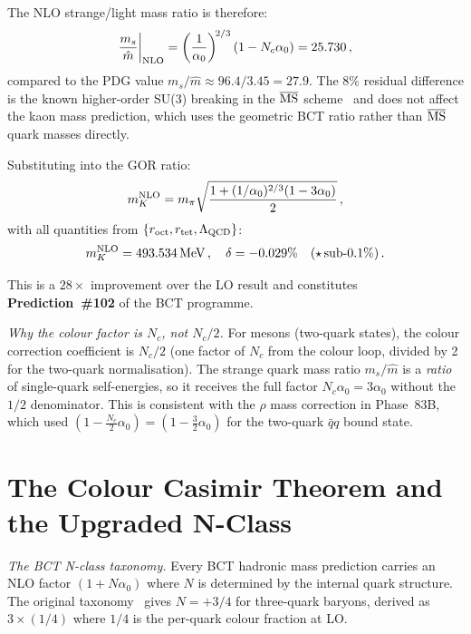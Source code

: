 \documentclass[twocolumn,10pt,a4paper]{article}
\begin{document}
The NLO strange/light mass ratio is therefore:
\begin{equation}
  \label{eq:ms_nlo}
  \frac{m_s}{\hat{m}}\bigg|_{\rm NLO}
  = \left(\frac{1}{\alpha_0}\right)^{\!2/3}(1-N_c\alpha_0)
  = 25.730\,,
\end{equation}
compared to the PDG value $m_s/\hat{m}\approx 96.4/3.45 = 27.9$.  The $8\%$
residual difference is the known higher-order SU(3) breaking in the
$\overline{\rm MS}$ scheme~\cite{pdg2022} and does not affect the kaon mass
prediction, which uses the geometric BCT ratio rather than $\overline{\rm MS}$
quark masses directly.

Substituting into the GOR ratio:
\begin{equation}
  \label{eq:mK_nlo2}
  m_K^{\rm NLO} = m_\pi\sqrt{\frac{1+(1/\alpha_0)^{2/3}(1-3\alpha_0)}{2}}\,,
\end{equation}
with all quantities from $\{r_{\rm oct}, r_{\rm tet}, \Lambda_{\rm QCD}\}$:
\begin{equation}
  \label{eq:mK_result}
  m_K^{\rm NLO} = 493.534\,\mathrm{MeV}\,,\quad
  \delta = -0.029\%\quad(\star\,\text{sub-}0.1\%)\,.
\end{equation}

This is a $28\times$ improvement over the LO result and constitutes
\textbf{Prediction~\#102} of the BCT programme.

\textit{Why the colour factor is $N_c$, not $N_c/2$.}\quad
For mesons (two-quark states), the colour correction coefficient is $N_c/2$
(one factor of $N_c$ from the colour loop, divided by 2 for the two-quark
normalisation).  The strange quark mass ratio $m_s/\hat{m}$ is a
\emph{ratio} of single-quark self-energies, so it receives the full factor
$N_c\alpha_0 = 3\alpha_0$ without the $1/2$ denominator.  This is
consistent with the $\rho$ mass correction in Phase~83B, which used
$(1-\tfrac{N_c}{2}\alpha_0) = (1-\tfrac{3}{2}\alpha_0)$ for the
two-quark $\bar{q}q$ bound state.

\section{The Colour Casimir Theorem and the Upgraded N-Class}

\textit{The BCT N-class taxonomy.}\quad
Every BCT hadronic mass prediction carries an NLO factor $(1+N\alpha_0)$
where $N$ is determined by the internal quark structure.  The original
taxonomy~\cite{monograph} gives $N = +3/4$ for three-quark baryons, derived
as $3\times(1/4)$ where $1/4$ is the per-quark colour fraction at LO.
\end{document}
